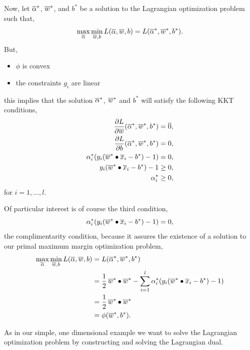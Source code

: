 \documentclass[a4paper,blends,pdf,colorBG,slideColor]{prosper}
\begin{document}
Now, let $\overline{\alpha}^*$, $\overline{w}^*$, and $b^*$ be a solution to the Lagrangian optimization problem
such that,
\begin{equation*}
\max_{\overline{\alpha}} \min_{\overline{w},b} L(\overline{\alpha},\overline{w},b) = L(\overline{\alpha}^*,\overline{w}^*,b^*).
\end{equation*}
But,
\begin{itemize}
\item $\phi$ is convex
\item the constraints $g_i$ are linear
\end{itemize}
this implies that the solution
 $\overline{\alpha}^*$, $\overline{w}^*$ and $b^*$ will satisfy
the following KKT conditions,
\begin{align*}
\frac{\partial L}{\partial \overline{w}}(\overline{\alpha}^*, \overline{w}^*, b^*) &= \overline{0},\\
\frac{\partial L}{\partial b}(\overline{\alpha}^*, \overline{w}^*, b^*) &= 0,\\
\alpha^*_i (y_i(\overline{w}^*\bullet\overline{x}_i -b^*) - 1) &= 0,\\
y_i(\overline{w}^*\bullet\overline{x}_i -b^*) - 1 &\ge 0,\\
\alpha_i^* &\ge 0,
\end{align*}
for $i = 1,\ldots,l$.
\es

Of particular interest is of course the third condition,
\[
\alpha^*_i (y_i(\overline{w}^*\bullet\overline{x}_i -b^*) - 1) = 0,
\]
the complimentarity condition, because it assures the existence of a solution to our primal 
maximum margin optimization problem,
\begin{align*}
\max_{\overline{\alpha}} \min_{\overline{w},b} L(\overline{\alpha},\overline{w},b) &= L(\overline{\alpha}^*,\overline{w}^*,b^*) \\
&= \frac{1}{2}\,\overline{w}^*\bullet\overline{w}^* - \sum_{i=1}^l \alpha^*_i (y_i(\overline{w}^*\bullet\overline{x}_i-b^*) - 1)\\
&=\frac{1}{2}\,\overline{w}^*\bullet\overline{w}^*\\
&= \phi(\overline{w}^*,b^*).
\end{align*}
\es

\small
As in our simple, one dimensional example we want to solve the Lagrangian optimization problem
by constructing and solving the Lagrangian dual.
\end{document}
